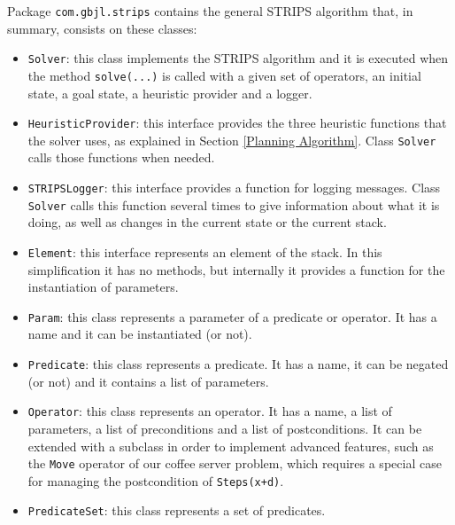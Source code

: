 \documentclass[12pt,a4paper,oneside]{article}
\numberwithin{equation}{section}
\numberwithin{equation}{section}
\theoremstyle{definition}
\begin{document}
Package \texttt{com.gbjl.strips} contains the general STRIPS algorithm that, in summary, consists on these classes:
\begin{itemize}
	\item \texttt{Solver}: this class implements the STRIPS algorithm and it is executed when the method \texttt{solve(...)} is called with a given set of operators, an initial state, a goal state, a heuristic provider and a logger.
	\item \texttt{HeuristicProvider}: this interface provides the three heuristic functions that the solver uses, as explained in Section \ref{Planning Algorithm}. Class \texttt{Solver} calls those functions when needed.
	\item \texttt{STRIPSLogger}: this interface provides a function for logging messages. Class \texttt{Solver} calls this function several times to give information about what it is doing, as well as changes in the current state or the current stack.
	\item \texttt{Element}: this interface represents an element of the stack. In this simplification it has no methods, but internally it provides a function for the instantiation of parameters.
	\item \texttt{Param}: this class represents a parameter of a predicate or operator. It has a name and it can be instantiated (or not).
	\item \texttt{Predicate}: this class represents a predicate. It has a name, it can be negated (or not) and it contains a list of parameters.
	\item \texttt{Operator}: this class represents an operator. It has a name, a list of parameters, a list of preconditions and a list of postconditions. It can be extended with a subclass in order to implement advanced features, such as the \texttt{Move} operator of our coffee server problem, which requires a special case for managing the postcondition of \texttt{Steps(x+d)}.
	\item \texttt{PredicateSet}: this class represents a set of predicates.
\end{itemize}
\end{document}

